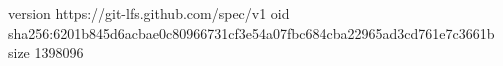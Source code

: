 version https://git-lfs.github.com/spec/v1
oid sha256:6201b845d6acbae0c80966731cf3e54a07fbc684cba22965ad3cd761e7c3661b
size 1398096
